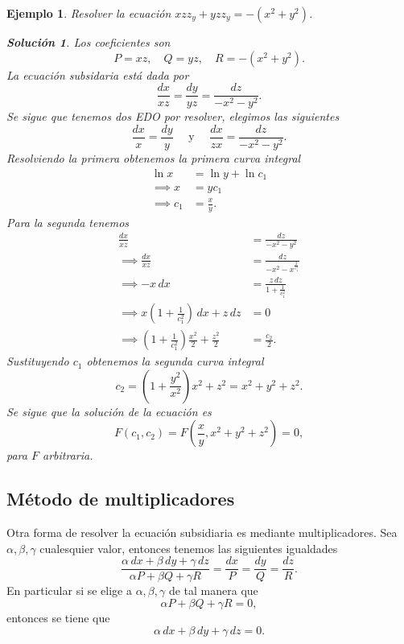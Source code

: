 \documentclass[11pt,letterpaper,draft]{report}
\newtheorem{example}[defn]{Ejemplo}
\newtheorem*{sol}{Solución}
\newcommand\<{\langle}
\renewcommand\>{\rangle}
\begin{document}
\begin{example}
  Resolver la ecuación $xz z_y + yz z_y = -(x^2+y^2)$.
  \begin{sol}
    Los coeficientes son
    \[
    P = xz, \quad Q = yz, \quad R = -(x^2+y^2).
    \] 
    La ecuación subsidaria está dada por
    \[
    \frac{dx}{xz} = \frac{dy}{yz} = \frac{dz}{-x^2-y^2}.
    \] 
    Se sigue que tenemos dos EDO por resolver, elegimos las
    siguientes
    \[
    \frac{dx}{x} = \frac{dy}{y} \quad \text{ y } \quad
    \frac{dx}{zx} = \frac{dz}{-x^2-y^2}.
    \] 
    Resolviendo la primera obtenemos la primera curva
    integral
    \begin{align*}
      \ln x &= \ln y + \ln c_1\\
      \implies x &= yc_1\\
      \implies c_1 &= \frac{x}{y}.
    \end{align*}
    Para la segunda tenemos
    \begin{align*}
      \frac{dx}{xz} &= \frac{dz}{-x^2-y^2}\\
      \implies \frac{dx}{xz} &= \frac{dz}{-x^2-x^\frac{2}{c_1^2}}\\
      \implies -x \, dx &= \frac{z \, dz}{1 + \frac{1}{c_1^2}}\\
      \implies x\left(1+\frac{1}{c_1^2}\right) \, dx + z \, dz &= 0\\
      \implies \left(1+\frac{1}{c_1^2}\right) \frac{x^2}{2} +
      \frac{z^2}{2} &= \frac{c_2}{2}.
    \end{align*}
    Sustituyendo $c_1$ obtenemos la segunda curva integral
    \[
    c_2 = \left(1+\frac{y^2}{x^2}\right) x^2 + z^2 = x^2 +
    y^2 + z^2.
    \] 
    Se sigue que la solución de la ecuación es
    \[
    F(c_1,c_2) = F\left(\frac{x}{y}, x^2+y^2+z^2\right) = 0,
    \] 
    para $F$ arbitraria.
  \end{sol}
\end{example}

\subsection{Método de multiplicadores}

Otra forma de resolver la ecuación subsidiaria es mediante
multiplicadores. Sea $\alpha, \beta, \gamma$ cualesquier
valor, entonces tenemos las siguientes igualdades
\[
\frac{\alpha \, dx + \beta \, dy + \gamma \, dz}{\alpha P +
\beta Q + \gamma R} = \frac{dx}{P} = \frac{dy}{Q} =
\frac{dz}{R}.
\] 
En particular si se elige a $\alpha, \beta, \gamma$ de tal
manera que
\[
\alpha P + \beta Q + \gamma R = 0,
\] 
entonces se tiene que
\[
\alpha \, dx + \beta \, dy + \gamma \, dz = 0.
\] 
\end{document}
